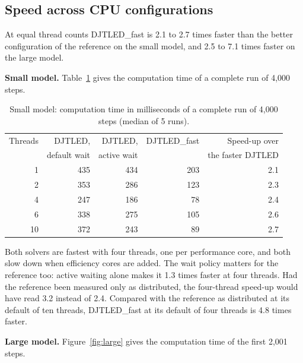 \documentclass[11pt,a4paper]{article}
\newcommand{\DJF}{DJTLED\_fast}
\begin{document}
\subsection{Speed across CPU configurations}
\label{sec:speed}

At equal thread counts \DJF{} is 2.1 to 2.7 times faster than the better configuration of the reference on the small model, and 2.5 to 7.1 times faster on the large model.

\textbf{Small model.} Table~\ref{tab:small} gives the computation time of a complete run of 4,000 steps.

\begin{table}[ht]
\centering
\small
\caption{Small model: computation time in milliseconds of a complete run of 4,000 steps (median of 5 runs).}
\label{tab:small}
\begin{tabular}{@{}rrrrr@{}}
\toprule
Threads & DJTLED, & DJTLED, & \DJF & Speed-up over \\
 & default wait & active wait & & the faster DJTLED \\
\midrule
1 & 435 & 434 & 203 & 2.1 \\
2 & 353 & 286 & 123 & 2.3 \\
4 & 247 & 186 & 78 & 2.4 \\
6 & 338 & 275 & 105 & 2.6 \\
10 & 372 & 243 & 89 & 2.7 \\
\bottomrule
\end{tabular}
\end{table}

Both solvers are fastest with four threads, one per performance core, and both slow down when efficiency cores are added. The wait policy matters for the reference too: active waiting alone makes it 1.3 times faster at four threads. Had the reference been measured only as distributed, the four-thread speed-up would have read 3.2 instead of 2.4. Compared with the reference as distributed at its default of ten threads, \DJF{} at its default of four threads is 4.8 times faster.

\textbf{Large model.} Figure~\ref{fig:large} gives the computation time of the first 2,001 steps.
\end{document}
